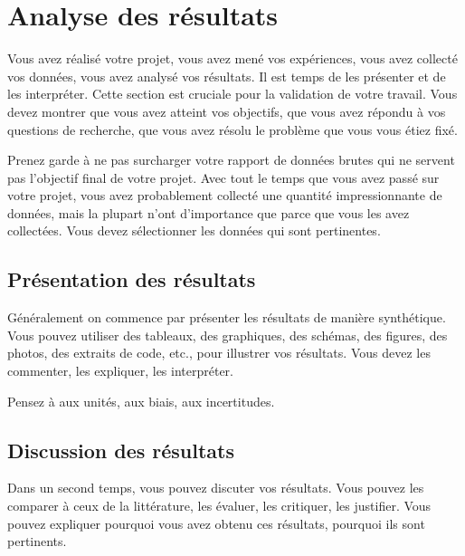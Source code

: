 \chapter{Analyse des résultats}

Vous avez réalisé votre projet, vous avez mené vos expériences, vous avez collecté vos données, vous avez analysé vos résultats. Il est temps de les présenter et de les interpréter. Cette section est cruciale pour la validation de votre travail. Vous devez montrer que vous avez atteint vos objectifs, que vous avez répondu à vos questions de recherche, que vous avez résolu le problème que vous vous étiez fixé.

Prenez garde à ne pas surcharger votre rapport de données brutes qui ne servent pas l'objectif final de votre projet. Avec tout le temps que vous avez passé sur votre projet, vous avez probablement collecté une quantité impressionnante de données, mais la plupart n'ont d'importance que parce que vous les avez collectées. Vous devez sélectionner les données qui sont pertinentes.

\section{Présentation des résultats}

Généralement on commence par présenter les résultats de manière synthétique. Vous pouvez utiliser des tableaux, des graphiques, des schémas, des figures, des photos, des extraits de code, etc., pour illustrer vos résultats. Vous devez les commenter, les expliquer, les interpréter.

Pensez à aux unités, aux biais, aux incertitudes.

\section{Discussion des résultats}

Dans un second temps, vous pouvez discuter vos résultats. Vous pouvez les comparer à ceux de la littérature, les évaluer, les critiquer, les justifier. Vous pouvez expliquer pourquoi vous avez obtenu ces résultats, pourquoi ils sont pertinents.

